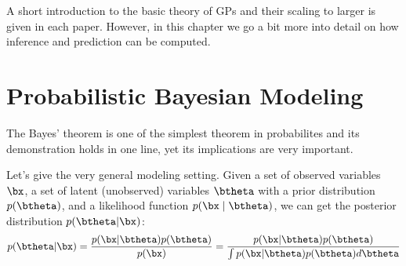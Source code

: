 


\graphicspath{{2/figures/}}

A short introduction to the basic theory of \acl{GPs} and their scaling to larger is given in each paper.
However, in this chapter we go a bit more into detail on how inference and prediction can be computed.


\section{Probabilistic Bayesian Modeling}

\label{sec:prob_bayes}

The Bayes' theorem is one of the simplest theorem in probabilites and its demonstration holds in one line, yet its implications are very important.

Let's give the very general modeling setting.
Given a set of observed variables $\bx$, a set of latent (unobserved) variables $\btheta$ with a prior distribution $p(\btheta)$, and a likelihood function $p(\bx\mid\btheta)$, we can get the posterior distribution $p(\btheta|\bx)$:
\begin{align}
p(\btheta|\bx) = \frac{p(\bx|\btheta)p(\btheta)}{p(\bx)} = \frac{p(\bx|\btheta)p(\btheta)}{\int p(\bx|\btheta)p(\btheta)d\btheta}
\label{eq:bayes}
\end{align}

